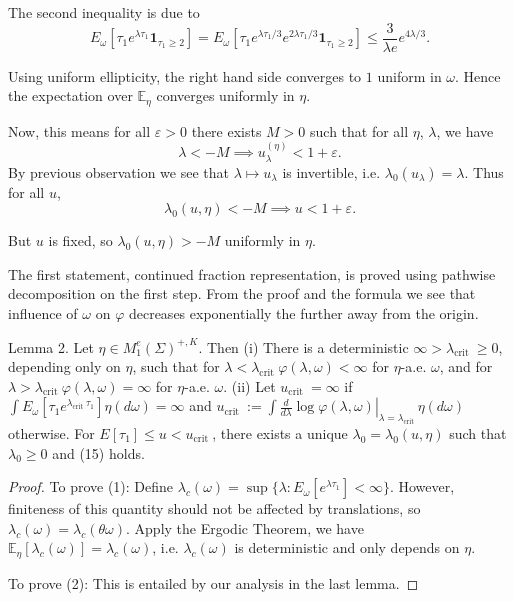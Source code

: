 The second inequality is due to
\[
	E_\omega \left[ \tau_1 e^{\lambda \tau_1} \mathbf{1}_{\tau_1 \ge 2} \right]
	= E_\omega \left[ \tau_1 e^{\lambda \tau_1 / 3}e^{2 \lambda \tau_1 / 3} \mathbf{1}_{\tau_1 \ge 2} \right]
	\le \frac{3}{\lambda e} e^{4 \lambda / 3}
.\] 

Using uniform ellipticity, the right hand side converges to $1$ uniform in $\omega$. Hence the expectation over $\mathbb{E}_\eta$ converges uniformly in $\eta$.

Now, this means for all $\varepsilon>0$ there exists $M > 0$ such that for all  $\eta$, $\lambda$, we have 
\[
	\lambda < - M \implies u_\lambda^{(\eta)} < 1 + \varepsilon
.\] 
By previous observation we see that $\lambda \mapsto u_\lambda$ is invertible, i.e. $\lambda_0(u_\lambda) = \lambda$. Thus for all $u$,
\[
	\lambda_0(u, \eta) < - M \implies u < 1 + \varepsilon
.\] 

But $u$ is fixed, so $\lambda_0(u, \eta) > - M$ uniformly in $\eta$.

The first statement, continued fraction representation, is proved using pathwise decomposition on the first step. From the proof and the formula we see that influence of $\omega$ on $\varphi$ decreases exponentially the further away from the origin.

\begin{lem}[Lemma 2]
	\label{lem:Comet00Lem2}
	Lemma 2. Let $\eta \in M_1^e(\Sigma)^{+, K}$. Then
(i) There is a deterministic $\infty>\lambda_{\text {crit }} \geq 0$, depending only on $\eta$, such that for $\lambda<\lambda_{\text {crit }} \varphi(\lambda, \omega)<\infty$ for $\eta$-a.e. $\omega$, and for $\lambda>\lambda_{\text {crit }} \varphi(\lambda, \omega)=\infty$ for $\eta$-a.e. $\omega$.
(ii) Let $u_{\text {crit }}=\infty$ if $\int E_\omega\left[\tau_1 e^{\lambda_{\text {crit }} \tau_1}\right] \eta(d \omega)=\infty$ and $u_{\text {crit }}:=\left.\int \frac{d}{d \lambda} \log \varphi(\lambda, \omega)\right|_{\lambda=\lambda_{\text {crit }}} \eta(d \omega)$ otherwise. For $E\left[\tau_1\right] \leq u<u_{\text {crit }}$, there exists a unique $\lambda_0=\lambda_0(u, \eta)$ such that $\lambda_0 \geq 0$ and (15) holds.
\end{lem}
\begin{proof}
	To prove (1): Define $\lambda_c(\omega) = \sup \{\lambda : E_\omega \left[ e^{\lambda \tau_1} \right] < \infty \} $. However, finiteness of this quantity should not be affected by translations, so $\lambda_c(\omega) = \lambda_c (\theta \omega)$. Apply the Ergodic Theorem, we have $\mathbb{E}_ \eta \left[ \lambda_c(\omega) \right] = \lambda_c(\omega)$, i.e. $\lambda_c(\omega)$ is deterministic and only depends on $\eta$.

	To prove (2): This is entailed by our analysis in the last lemma.
\end{proof}

